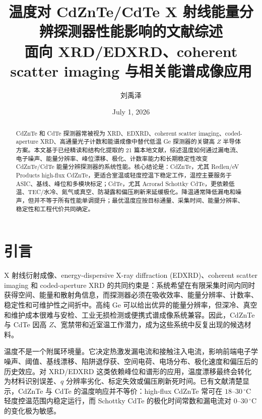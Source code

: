 \documentclass[
  aps,
  prd,
  reprint,
  superscriptaddress,
  floatfix,
  amsmath,
  amssymb
]{revtex4-2}
\newcommand{\degc}{^\circ\mathrm{C}}
\begin{document}
\title{温度对 CdZnTe/CdTe X 射线能量分辨探测器性能影响的文献综述\\
\large 面向 XRD/EDXRD、coherent scatter imaging 与相关能谱成像应用}
\author{刘禹泽}
\date{July 1, 2026}

\begin{abstract}
CdZnTe 和 CdTe 探测器常被视为 XRD、EDXRD、coherent scatter imaging、coded-aperture XRD、高通量光子计数和能谱成像中替代低温 Ge 探测器的关键高 $Z$ 半导体方案。本文基于已经精读和结构化提取的 21 篇本地文献，综述温度如何通过漏电流、电子噪声、能量分辨率、峰位漂移、极化、计数率能力和长期稳定性改变 CdZnTe/CdTe 能量分辨探测器的系统性能。核心结论是：CdZnTe，尤其 Redlen/eV Products high-flux CdZnTe，更适合室温或轻度控温下稳定工作，温控主要服务于 ASIC、基线、峰位和多模块标定；CdTe，尤其 Acrorad Schottky CdTe，更依赖低温、TEC/水冷、氮气或真空、防凝露和偏压刷新来延缓极化。降温通常降低漏电和噪声，但并不等于所有性能单调提升；最优温度应按目标通量、采集时间、能量分辨率、稳定性和工程代价共同确定。
\end{abstract}

\maketitle

\section{引言}

X 射线衍射成像、energy-dispersive X-ray diffraction (EDXRD)、coherent scatter imaging 和 coded-aperture XRD 的共同约束是：系统希望在有限采集时间内同时获得空间、能量和散射角信息，而探测器必须在吸收效率、能量分辨率、计数率、稳定性和可维护性之间折中。高纯 Ge 可以给出优异的能量分辨率，但深冷、真空和维护成本很难与安检、工业无损检测或便携式谱成像系统兼容。因此，CdZnTe 与 CdTe 因高 $Z$、宽禁带和近室温工作潜力，成为这些系统中反复出现的候选材料\cite{kosciesza2013,montemont2013,greenberg2014,greenberg2016,stryker2021}。

温度不是一个附属环境量。它决定热激发漏电流和接触注入电流，影响前端电子学噪声、阈值、基线漂移、陷阱退俘获、空间电荷、电场分布、极化速度和偏压后的历史效应。对 XRD/EDXRD 这类依赖峰位和谱形的应用，温度漂移最终会转化为材料识别误差、$q$ 分辨率劣化、标定失效或偏压刷新死时间。已有文献清楚显示，CdZnTe 与 CdTe 的温度响应并不等价：high-flux CdZnTe 常可在 $18$--$30\,\degc$ 轻度控温范围内稳定运行，而 Schottky CdTe 的极化时间常数和漏电流对 $0$--$30\,\degc$ 的变化极为敏感\cite{veale2020,cline2024,greiffenberg2025,astromskas2016,meyer2022}。
\end{document}
